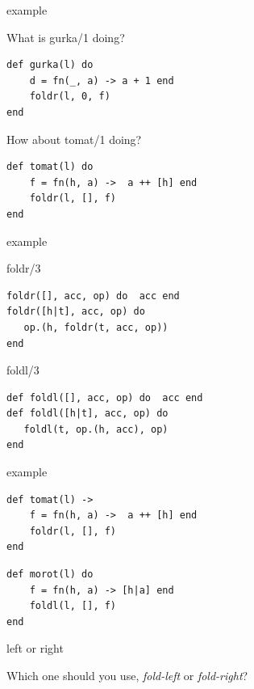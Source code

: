 \begin{frame}[fragile]{example}

\pause What is gurka/1 doing?

\pause\vspace{20pt}

\begin{verbatim}
def gurka(l) do 
    d = fn(_, a) -> a + 1 end
    foldr(l, 0, f)
end
\end{verbatim}

\pause\vspace{20pt}
\pause How about tomat/1 doing?

\pause\vspace{10pt}
\begin{verbatim}
def tomat(l) do 
    f = fn(h, a) ->  a ++ [h] end
    foldr(l, [], f)
end
\end{verbatim}
\end{frame}

\begin{frame}[fragile]{example}
     \begin{block}{foldr/3}
       \begin{verbatim}
foldr([], acc, op) do  acc end
foldr([h|t], acc, op) do
   op.(h, foldr(t, acc, op))
end
       \end{verbatim}
       \vfill
     \end{block}
\pause

     \begin{block}{foldl/3}
       \begin{verbatim}
def foldl([], acc, op) do  acc end
def foldl([h|t], acc, op) do
   foldl(t, op.(h, acc), op)
end
       \end{verbatim}
     \end{block}
\end{frame}


\begin{frame}[fragile]{example}

\pause\vspace{10pt}
\begin{verbatim}
def tomat(l) -> 
    f = fn(h, a) ->  a ++ [h] end
    foldr(l, [], f)
end
\end{verbatim}
\pause 
\begin{verbatim}
def morot(l) do 
    f = fn(h, a) -> [h|a] end
    foldl(l, [], f)
end
\end{verbatim}
\end{frame}

\begin{frame}{left or right}

Which one should you use, {\em fold-left} or {\em fold-right}?

\end{frame}

